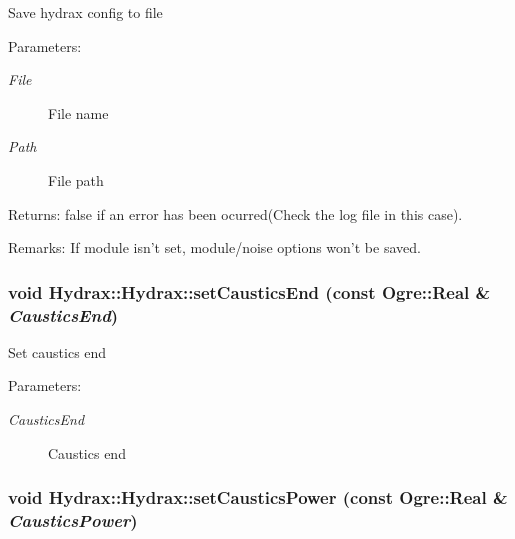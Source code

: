 Save hydrax config to file \begin{Desc}
\item[Parameters:]
\begin{description}
\item[{\em File}]File name \item[{\em Path}]File path \end{description}
\end{Desc}
\begin{Desc}
\item[Returns:]false if an error has been ocurred(Check the log file in this case). \end{Desc}
\begin{Desc}
\item[Remarks:]If module isn't set, module/noise options won't be saved. \end{Desc}
\hypertarget{class_hydrax_1_1_hydrax_f194156ce3a8647bcb447a2ce8d8c932}{
\subsubsection[{setCausticsEnd}]{\setlength{\rightskip}{0pt plus 5cm}void Hydrax::Hydrax::setCausticsEnd (const Ogre::Real \& {\em CausticsEnd})}}
\label{class_hydrax_1_1_hydrax_f194156ce3a8647bcb447a2ce8d8c932}


Set caustics end \begin{Desc}
\item[Parameters:]
\begin{description}
\item[{\em CausticsEnd}]Caustics end \end{description}
\end{Desc}
\hypertarget{class_hydrax_1_1_hydrax_78ed497eda748ca0699f170cbc491e13}{
\subsubsection[{setCausticsPower}]{\setlength{\rightskip}{0pt plus 5cm}void Hydrax::Hydrax::setCausticsPower (const Ogre::Real \& {\em CausticsPower})}}
\label{class_hydrax_1_1_hydrax_78ed497eda748ca0699f170cbc491e13}


